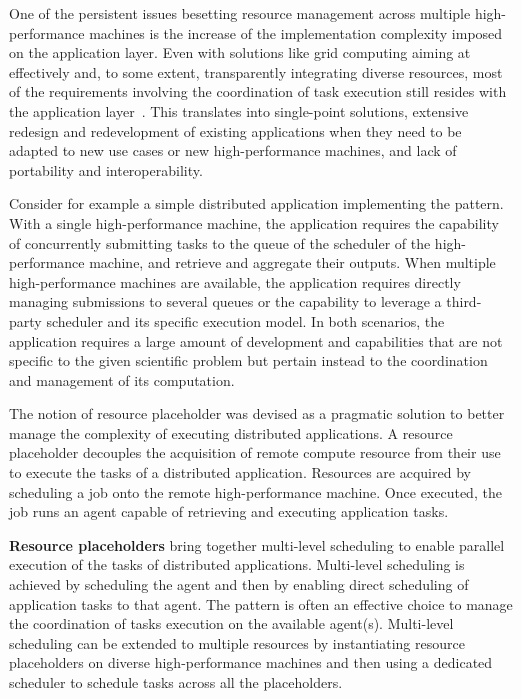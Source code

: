 \documentclass{sig-alternate}
\begin{document}
One of the persistent issues besetting resource management across multiple
high-performance machines is the increase of the implementation complexity
imposed on the application layer. Even with solutions like grid computing aiming
at effectively and, to some extent, transparently integrating diverse resources,
most of the requirements involving the coordination of task execution still
resides with the application layer~\cite{legrand2003,krauter2002,darema2005}.
This translates into single-point solutions, extensive redesign and
redevelopment of existing applications when they need to be adapted to new use
cases or new high-performance machines, and lack of portability and
interoperability.

Consider for example a simple distributed application implementing the \MW
pattern. With a single high-performance machine, the application requires the
capability of concurrently submitting tasks to the queue of the scheduler of the
high-performance machine, and retrieve and aggregate their outputs. When
multiple high-performance machines are available, the application requires
directly managing submissions to several queues or the capability to leverage a
third-party scheduler and its specific execution model. In both scenarios, the
application requires a large amount of development and capabilities that are not
specific to the given scientific problem but pertain instead to the coordination
and management of its computation.

The notion of resource placeholder was devised as a pragmatic solution to better
manage the complexity of executing distributed applications. A resource
placeholder decouples the acquisition of remote compute resource from their use
to execute the tasks of a distributed application. Resources are acquired by
scheduling a job onto the remote high-performance machine. Once executed, the
job runs an agent capable of retrieving and executing application tasks.

{\bf Resource placeholders} bring together mul\-ti-\-le\-vel sche\-du\-ling to
enable parallel execution of the tasks of distributed applications.
Mul\-ti-\-le\-vel sche\-du\-ling is achieved by scheduling the agent and then by
enabling direct scheduling of application tasks to that agent. The \MW pattern
is often an effective choice to manage the coordination of tasks execution on
the available agent(s).  Mul\-ti-\-le\-vel sche\-du\-ling can be extended to
multiple resources by instantiating resource placeholders on diverse
high-performance machines and then using a dedicated scheduler to schedule tasks
across all the placeholders.
\end{document}
